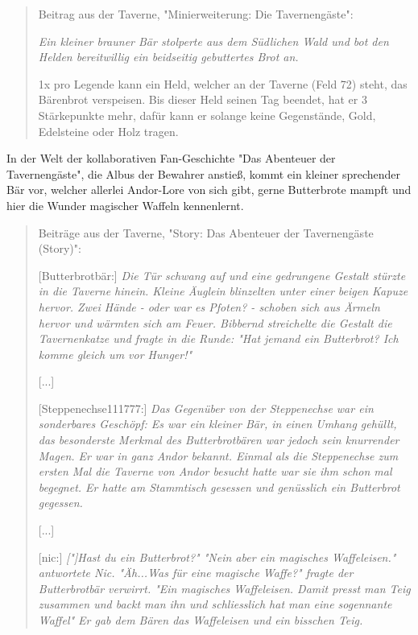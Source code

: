 \documentclass[10pt, a4paper, oneside]{book}
\begin{document}
{\begin{quote}
    Beitrag aus der Taverne, "Minierweiterung: Die Tavernengäste": 
    
    \textit{Ein kleiner brauner Bär stolperte aus dem Südlichen Wald und bot den Helden bereitwillig ein beidseitig gebuttertes Brot an.} 
    
    1x pro Legende kann ein Held, welcher an der Taverne (Feld 72) steht, das Bärenbrot verspeisen. Bis dieser Held seinen Tag beendet, hat er 3 Stärkepunkte mehr, dafür kann er solange keine Gegenstände, Gold, Edelsteine oder Holz tragen.
\end{quote}

In der Welt der kollaborativen Fan-Geschichte "Das Abenteuer der Tavernengäste", die Albus der Bewahrer anstieß, kommt ein kleiner sprechender Bär vor, welcher allerlei Andor-Lore von sich gibt, gerne Butterbrote mampft und hier die Wunder magischer Waffeln kennenlernt.

\begin{quote}
    Beiträge aus der Taverne, "Story: Das Abenteuer der Tavernengäste (Story)": 
    
    [Butterbrotbär:] \textit{Die Tür schwang auf und eine gedrungene Gestalt stürzte in die Taverne hinein. Kleine Äuglein blinzelten unter einer beigen Kapuze hervor. Zwei Hände - oder war es Pfoten? - schoben sich aus Ärmeln hervor und wärmten sich am Feuer. Bibbernd streichelte die Gestalt die Tavernenkatze und fragte in die Runde: "Hat jemand ein Butterbrot? Ich komme gleich um vor Hunger!"} 

    [...]
    
    [Steppenechse111777:] \textit{Das Gegenüber von der Steppenechse war ein sonderbares Geschöpf: Es war ein kleiner Bär, in einen Umhang gehüllt, das besonderste Merkmal des Butterbrotbären war jedoch sein knurrender Magen. Er war in ganz Andor bekannt. Einmal als die Steppenechse zum ersten Mal die Taverne von Andor besucht hatte war sie ihm schon mal begegnet. Er hatte am Stammtisch gesessen und genüsslich ein Butterbrot gegessen.} 

    [...]
    
    [nic:] \textit{["]Hast du ein Butterbrot?" "Nein aber ein magisches Waffeleisen." antwortete Nic. "Äh...Was für eine magische Waffe?" fragte der Butterbrotbär verwirrt. "Ein magisches Waffeleisen. Damit presst man Teig zusammen und backt man ihn und schliesslich hat man eine sogennante Waffel" Er gab dem Bären das Waffeleisen und ein bisschen Teig.}
\end{quote}


}
\end{document}
